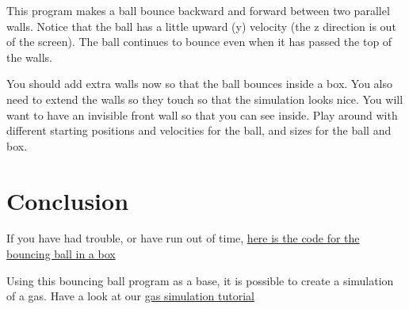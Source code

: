 \documentclass[12pt]{article}
\begin{document}
This program makes a ball bounce backward and forward between two parallel walls.
Notice that the ball has a little upward (y) velocity (the z direction is out of the screen).
The ball continues to bounce even when it has  passed the top of the walls.

You should add extra walls now so that the ball bounces inside a box.
You also need to extend the walls so they touch so that the simulation looks nice.
You will want to have an invisible front wall so that you can see inside.
Play around with different starting positions and velocities for the ball,
and sizes for the ball and box.



\section{Conclusion}

If you have had trouble, or have run out of time,
\href{bounce2.html}{here is the code for the bouncing ball in a box}

Using this bouncing ball program as a base, it is possible to create a simulation of a gas.
Have a look at our \href{tute-gas.html}{gas simulation tutorial}


\end{document}
